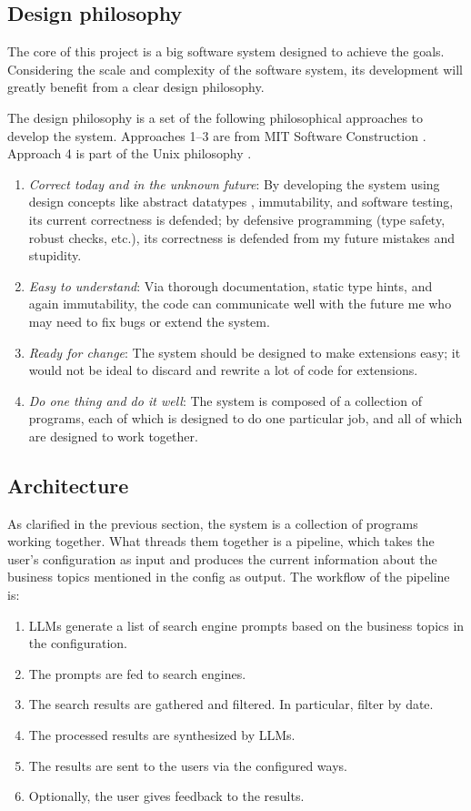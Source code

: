 \documentclass[final-report]{report-template}
\begin{document}
\subsection{Design philosophy} \label{sec.design.philo}
The core of this project is a big software system designed to achieve the
goals. Considering the scale and complexity of the software system, its
development will greatly benefit from a clear design philosophy.

The design philosophy is a set of the following philosophical approaches
to develop the system. Approaches 1--3 are from MIT Software Construction
\cite{mit.software.construction}. Approach 4 is part of the Unix
philosophy \cite{unix.philosophy}.

\begin{enumerate}
	\item 
	\emph{Correct today and in the unknown future}: By developing the
	system using design concepts like abstract datatypes \cite{adt},
	immutability, and software testing, its current correctness is defended;
	by defensive programming (type safety, robust checks, etc.), its
	correctness is defended from my future mistakes and stupidity.
	\item 
	\emph{Easy to understand}: Via thorough documentation, static type hints,
	and again immutability, the code can communicate well with the future me
	who may need to fix bugs or extend the system.
	\item
	\emph{Ready for change}: The system should be designed to make extensions
	easy; it would not be ideal to discard and rewrite a lot of code for
	extensions. 
	\item
	\emph{Do one thing and do it well}: The system is composed of a collection
	of programs, each of which is designed to do one particular job, and all of
	which are designed to work together.
\end{enumerate}

\subsection{Architecture}
As clarified in the previous section, the system is a collection of programs
working together. What threads them together is a pipeline, which takes the
user's configuration as input and produces the current information about the
business topics mentioned in the config as output. The workflow of the pipeline
is:
\begin{enumerate}
	\item LLMs generate a list of search engine prompts based on the business topics
		in the configuration.
	\item The prompts are fed to search engines.	
	\item The search results are gathered and filtered. In particular, filter
		by date.	
	\item The processed results are synthesized by LLMs.
	\item The results are sent to the users via the configured ways.
	\item Optionally, the user gives feedback to the results. 
\end{enumerate}
\end{document}
